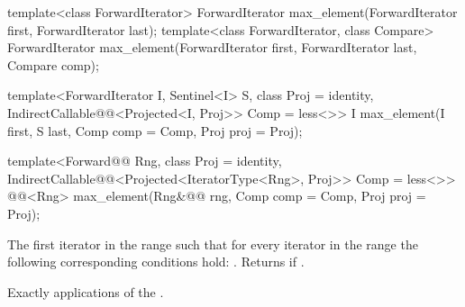 %
\begin{removedblock}
\begin{itemdecl}
template<class ForwardIterator>
  ForwardIterator max_element(ForwardIterator first, ForwardIterator last);
template<class ForwardIterator, class Compare>
  ForwardIterator max_element(ForwardIterator first, ForwardIterator last,
                            Compare comp);
\end{itemdecl}
\end{removedblock}
\begin{addedblock}
\begin{itemdecl}
template<ForwardIterator I, Sentinel<I> S, class Proj = identity,
    IndirectCallable@@<Projected<I, Proj>> Comp = less<>>
  I max_element(I first, S last, Comp comp = Comp{}, Proj proj = Proj{});

template<Forward@@ Rng, class Proj = identity,
    IndirectCallable@@<Projected<IteratorType<Rng>, Proj>> Comp = less<>>
  @@<Rng>
    max_element(Rng&@\newtxt{\&}@ rng, Comp comp = Comp{}, Proj proj = Proj{});
\end{itemdecl}
\end{addedblock}

\begin{itemdescr}
\pnum
\returns
The first iterator
in the range
such that for every iterator
in the range
the following corresponding conditions hold:
.
Returns
if
.

\pnum
\complexity
Exactly
applications of the .
\end{itemdescr}

